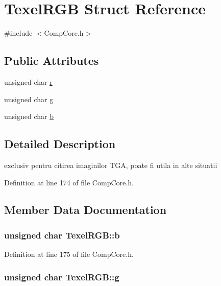 \hypertarget{struct_texel_r_g_b}{\section{Texel\-R\-G\-B Struct Reference}
\label{struct_texel_r_g_b}
}


{\ttfamily \#include $<$Comp\-Core.\-h$>$}

\subsection*{Public Attributes}
\begin{DoxyCompactItemize}
\item 
unsigned char \hyperlink{struct_texel_r_g_b_ad62f973f1db93f3c02e5288ec0fb32c8}{r}
\item 
unsigned char \hyperlink{struct_texel_r_g_b_a9de470616b6b5ef114bf3806c12142dc}{g}
\item 
unsigned char \hyperlink{struct_texel_r_g_b_ac524adc8d2190f021f42f24aea7dc1a2}{b}
\end{DoxyCompactItemize}


\subsection{Detailed Description}
exclusiv pentru citirea imaginilor T\-G\-A, poate fi utila in alte situatii 

Definition at line 174 of file Comp\-Core.\-h.



\subsection{Member Data Documentation}
\hypertarget{struct_texel_r_g_b_ac524adc8d2190f021f42f24aea7dc1a2}{
\subsubsection[{b}]{\setlength{\rightskip}{0pt plus 5cm}unsigned char Texel\-R\-G\-B\-::b}}\label{struct_texel_r_g_b_ac524adc8d2190f021f42f24aea7dc1a2}


Definition at line 175 of file Comp\-Core.\-h.

\hypertarget{struct_texel_r_g_b_a9de470616b6b5ef114bf3806c12142dc}{
\subsubsection[{g}]{\setlength{\rightskip}{0pt plus 5cm}unsigned char Texel\-R\-G\-B\-::g}}\label{struct_texel_r_g_b_a9de470616b6b5ef114bf3806c12142dc}


